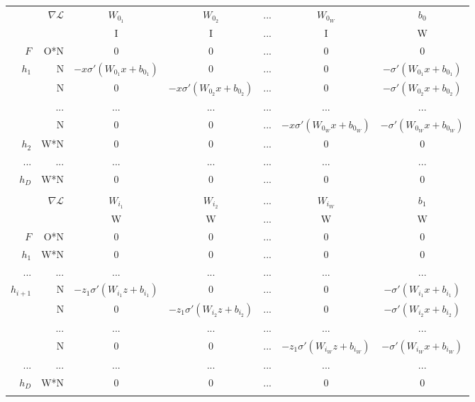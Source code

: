 \footnotesize
\begin{tabular}{r r | c c c c c}\hline

& $\nabla\mathcal{L}$ & $W_{0_1}$ & $W_{0_2}$ & ... & $W_{0_W}$ & $b_0$ \\
& & I & I &...& I & W \\ \hline
$F$ & O*N & 0 & 0 &...& 0 & 0\\ \hline
$h_1$ & N & 		$-x\sigma'(W_{0_1}x+b_{0_1})$ & 0 &...& 0 & $-\sigma'(W_{0_1}x+b_{0_1})$ \\
      & N & 0 & 	$-x\sigma'(W_{0_2}x+b_{0_2})$ &...& 0 &  	$-\sigma'(W_{0_2}x+b_{0_2})$ \\
      &...&...&...&...&...&... \\
      & N & 0 & 0 &...& $-x\sigma'(W_{0_W}x+b_{0_W})$ &  		$-\sigma'(W_{0_W}x+b_{0_W})$ \\ \hline
$h_2$ & W*N & 0 & 0 &...& 0 & 0 \\
...   & ... &...&...&...&...&...\\ 
$h_{D}$ & W*N & 0 & 0 &...& 0 & 0 \\ \hline \\ \hline

& $\nabla\mathcal{L}$ & $W_{i_1}$ & $W_{i_2}$ &...& $W_{i_W}$ & $b_1$ \\
& & W & W &...& W & W \\ \hline
$F$ & O*N & 0 & 0 &...& 0 & 0 \\ \hline
$h_1$ & W*N & 0 & 0 &...& 0 & 0 \\
...   & ... &...&...&...&...&...\\ \hline
$h_{i+1}$ & N & 		$-z_1\sigma'(W_{i_1}z + b_{i_1})$ & 0 &...& 0 & $-\sigma'(W_{i_1}x+b_{i_1})$ \\
      & N & 0 & 	$-z_1\sigma'(W_{i_2}z + b_{i_2})$ &...& 0 & 	$-\sigma'(W_{i_2}x+b_{i_2})$ \\
      &...&...&...&...&...&... \\
      & N & 0 & 0 &...& $-z_1\sigma'(W_{i_W}z + b_{i_W})$ & 		$-\sigma'(W_{i_W}x+b_{i_W})$ \\ \hline
...   & ... &...&...&...&...&...\\ 
$h_{D}$ & W*N & 0 & 0 &...& 0 & 0 \\ \hline \\ \hline


\end{tabular}
